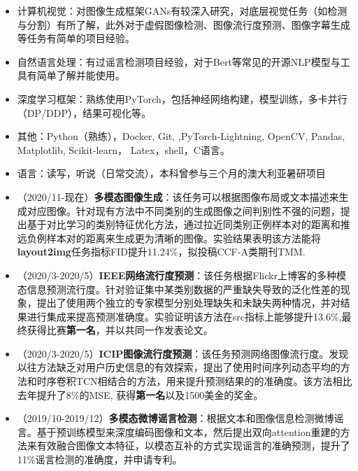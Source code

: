 \documentclass[zh]{resume}
\begin{document}
\begin{itemize}
  \item 计算机视觉：对图像生成框架GANs有较深入研究，对底层视觉任务（如检测与分割）有所了解，此外对于虚假图像检测、图像流行度预测、图像字幕生成等任务有简单的项目经验。
  \item 自然语言处理：有过谣言检测项目经验，对于Bert等常见的开源NLP模型与工具有简单了解并能使用。
  \item 深度学习框架：熟练使用PyTorch，包括神经网络构建，模型训练，多卡并行（DP/DDP），结果可视化等。
  \item 其他：Python（熟练），Docker, Git, ,PyTorch-Lightning, OpenCV, Pandas, Matplotlib, Scikit-learn， Latex，shell，C语言。
  \item 语言：读写，听说（日常交流），本科曾参与三个月的澳大利亚暑研项目
\end{itemize}

\begin{itemize}
  \item  （2020/11-现在）\textbf{多模态图像生成}：该任务可以根据图像布局或文本描述来生成对应图像。针对现有方法中不同类别的生成图像之间判别性不强的问题，提出基于对比学习的类别特征优化方法，通过拉近同类别正例样本对的距离和推远负例样本对的距离来生成更为清晰的图像。实验结果表明该方法能将\textbf{layout2img}任务指标FID提升11.24$\%$，拟投稿CCF-A类期刊TMM.
  \item （2020/3-2020/5）\textbf{IEEE网络流行度预测}：该任务根据Flickr上博客的多种模态信息预测流行度。针对验证集中某类别数据的严重缺失导致的泛化性差的现象，提出了使用两个独立的专家模型分别处理缺失和未缺失两种情况，并对结果进行集成来提高预测准确度。实验证明该方法在src指标上能够提升13.6$\%$,最终获得比赛\textbf{第一名}，并以共同一作发表论文。
  \item （2020/3-2020/5）\textbf{ICIP图像流行度预测}：该任务预测网络图像流行度。发现以往方法缺乏对用户历史信息的有效探索，提出了使用时间序列动态平均的方法和时序卷积TCN相结合的方法，用来提升预测结果的的准确度。该方法相比去年提升了8$\%$的MSE, 获得\textbf{第一名}以及1500美金的奖金。
  \item （2019/10-2019/12）\textbf{多模态微博谣言检测}：根据文本和图像信息检测微博谣言。基于预训练模型来深度编码图像和文本，然后提出双向attention重建的方法来有效融合图像文本特征，以模态互补的方式实现谣言的准确预测，提升了11$\%$谣言检测的准确度，并申请专利。

\end{itemize}
\end{document}
